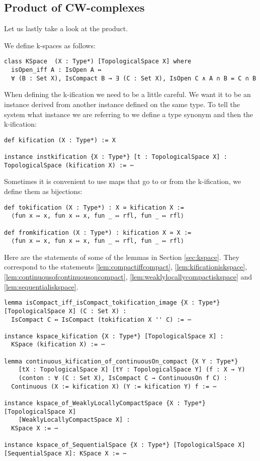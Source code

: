 \subsection{Product of CW-complexes}

Let us lastly take a look at the product. 

We define k-spaces as follows: 

\begin{lstlisting}
class KSpace  (X : Type*) [TopologicalSpace X] where
  isOpen_iff A : IsOpen A ↔
  ∀ (B : Set X), IsCompact B → ∃ (C : Set X), IsOpen C ∧ A ∩ B = C ∩ B
\end{lstlisting}

When defining the k-ification we need to be a little careful. 
We want it to be an instance derived from another instance defined on the same type. 
To tell the system what instance we are referring to we define a type synonym and then the k-ification: 

\begin{lstlisting}
def kification (X : Type*) := X

instance instkification {X : Type*} [t : TopologicalSpace X] : TopologicalSpace (kification X) := ⋯
\end{lstlisting}

Sometimes it is convenient to use maps that go to or from the k-ification, we define them as bijections:

\begin{lstlisting}
def tokification (X : Type*) : X ≃ kification X :=
  ⟨fun x ↦ x, fun x ↦ x, fun _ ↦ rfl, fun _ ↦ rfl⟩
  
def fromkification (X : Type*) : kification X ≃ X :=
  ⟨fun x ↦ x, fun x ↦ x, fun _ ↦ rfl, fun _ ↦ rfl⟩
\end{lstlisting}

Here are the statements of some of the lemmas in Section \ref{sec:kspace}. 
They correspond to the statements \ref{lem:compactiffcompact}, \ref{lem:kificationiskspace}, \ref{lem:continuousofcontinuousoncompact}, \ref{lem:weaklylocallycompactiskspace} and \ref{lem:sequentialiskspace}.

\begin{lstlisting}
lemma isCompact_iff_isCompact_tokification_image {X : Type*} [TopologicalSpace X] (C : Set X) :
  IsCompact C ↔ IsCompact (tokification X '' C) := ⋯

instance kspace_kification {X : Type*} [TopologicalSpace X] : 
  KSpace (kification X) := ⋯

lemma continuous_kification_of_continuousOn_compact {X Y : Type*} 
    [tX : TopologicalSpace X] [tY : TopologicalSpace Y] (f : X → Y) 
    (conton : ∀ (C : Set X), IsCompact C → ContinuousOn f C) :
  Continuous (X := kification X) (Y := kification Y) f := ⋯

instance kspace_of_WeaklyLocallyCompactSpace {X : Type*}[TopologicalSpace X]
    [WeaklyLocallyCompactSpace X] : 
  KSpace X := ⋯

instance kspace_of_SequentialSpace {X : Type*} [TopologicalSpace X] [SequentialSpace X]: KSpace X := ⋯
\end{lstlisting}

